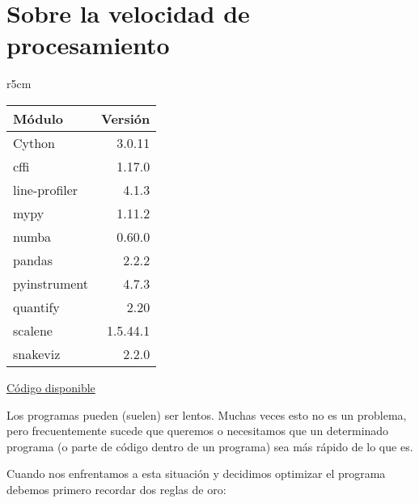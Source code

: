 

\chapter{Sobre la velocidad de procesamiento} \label{ch:profiling}

\begin{wraptable}{r}{5cm}
\begin{modulesinfo}
\begin{center}
{\small
    \begin{tabular}{l r}
        \toprule
        \textbf{Módulo} & \textbf{Versión} \\
        \midrule
        Cython & 3.0.11 \\
        cffi & 1.17.0 \\
        line-profiler & 4.1.3 \\
        mypy & 1.11.2 \\
        numba & 0.60.0 \\
        pandas & 2.2.2 \\
        pyinstrument & 4.7.3 \\
        quantify & 2.20 \\
        scalene & 1.5.44.1 \\
        snakeviz & 2.2.0 \\
        \bottomrule
    \end{tabular}
    \vspace{0.75em}

    \href{https://github.com/facundobatista/libro-pyciencia/tree/master/código/profiling/}{Código disponible}
}
\end{center}
\end{modulesinfo}
\end{wraptable}

Los programas pueden (suelen) ser lentos. Muchas veces esto no es un problema, pero frecuentemente sucede que queremos o necesitamos que un determinado programa (o parte de código dentro de un programa) sea más rápido de lo que es.

Cuando nos enfrentamos a esta situación y decidimos optimizar el programa debemos primero recordar dos reglas de oro:


